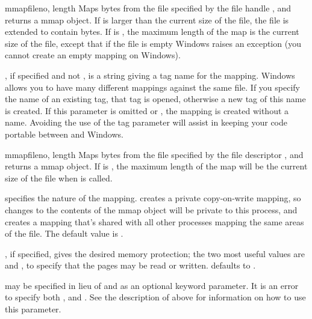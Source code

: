 \begin{funcdesc}{mmap}{fileno, length}
   Maps  bytes from the file
  specified by the file handle , and returns a mmap
  object.  If  is larger than the current size of the file,
  the file is extended to contain  bytes.  If 
  is , the maximum length of the map is the current size
  of the file, except that if the file is empty Windows raises an
  exception (you cannot create an empty mapping on Windows).

  , if specified and not , is a string giving
  a tag name for the mapping.  Windows allows you to have many
  different mappings against the same file.  If you specify the name
  of an existing tag, that tag is opened, otherwise a new tag of this
  name is created.  If this parameter is omitted or , the
  mapping is created without a name.  Avoiding the use of the tag
  parameter will assist in keeping your code portable between \UNIX{}
  and Windows.
\end{funcdesc}

\begin{funcdescni}{mmap}{fileno, length}
   Maps  bytes from the file
  specified by the file descriptor , and returns a mmap
  object.  If  is , the maximum length of the map
  will be the current size of the file when  is
  called.
  
   specifies the nature of the mapping.
   creates a private copy-on-write mapping, so
  changes to the contents of the mmap object will be private to this
  process, and  creates a mapping that's shared
  with all other processes mapping the same areas of the file.  The
  default value is .

  , if specified, gives the desired memory protection; the
  two most useful values are  and
  , to specify that the pages may be read or
  written.   defaults to .

   may be specified in lieu of  and 
  as an optional keyword parameter.  It is an error to specify both
  ,  and .  See the description of
   above for information on how to use this parameter.
\end{funcdescni}


